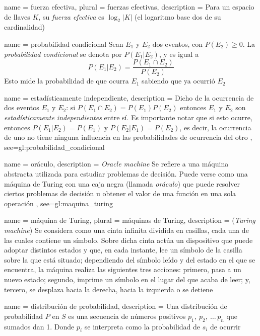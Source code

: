 {
  name = fuerza efectiva,
  plural = fuerzas efectivas,
  description = {
    Para un espacio de llaves $ K $, su \textit{fuerza efectiva} es
    $ \log_2 | K | $ (el logaritmo base dos de su cardinalidad)%
  }
}

{
  name = probabilidad condicional
}
{%
  Sean $ E_1 $ y $ E_2 $ dos eventos, con $ P(E_2) \ge 0 $. La
  \textit{probabilidad condicional} se denota por $ P(E_1 | E_2) $, y es
  igual a
  $$ P(E_1 | E_2) = \frac{P(E_1 \cap E_2)}{P(E_2)} $$
  Esto mide la probabilidad de que ocurra $ E_1 $ sabiendo que ya ocurrió
  $ E_2 $%
}

{
  name = estadísticamente independiente,
  description = {
    Dicho de la ocurrencia de dos eventos $ E_1 $ y $ E_2 $: si
    $ P(E_1 \cap E_2) = P(E_1) P(E_2) $ entonces $ E_1 $ y $ E_2 $ son
    \textit{estadísticamente independientes} entre sí. Es importante notar
    que si esto ocurre, entonces $ P(E_1 | E_2) = P(E_1) $ y
    $ P(E_2 | E_1) = P(E_2) $, es decir, la ocurrencia de uno no tiene ninguna
    influencia en las probabilidades de ocurrencia del otro%
  },
  see={gl:probabilidad_condicional}
}

{
  name = oráculo,
  description = {
    \textit{Oracle machine} Se refiere a una máquina abstracta utilizada para
    estudiar problemas de decisión. Puede verse como una máquina de Turing con
    una caja negra (llamada \textit{oráculo}) que puede resolver ciertos
    problemas de decisión u obtener el valor de una función en una sola
    operación%
  },
  see={gl:maquina_turing}
}

{
  name = máquina de Turing,
  plural = máquinas de Turing,
  description = {
    (\textit{Turing machine}) Se considera como una cinta infinita dividida
    en casillas, cada una de las cuales contiene un símbolo. Sobre dicha cinta
    actúa un dispositivo que puede adoptar distintos estados y que, en cada
    instante, lee un símbolo de la casilla sobre la que está situado;
    dependiendo del símbolo leído y del estado en el que se encuentra, la
    máquina realiza las siguientes tres acciones: primero, pasa a un nuevo
    estado; segundo, imprime un símbolo en el lugar del que acaba de leer;
    y, tercero, se desplaza hacia la derecha, hacia la izquierda o se detiene%
  }
}

{
  name = distribución de probabilidad,
  description = {
    Una distribución de probabilidad $P$ en $S$ es una secuencia de números
    positivos $p_1,\: p_2,\: \dots\, p_n$ que sumados dan 1. Donde $p_i$ se
    interpreta como la probabilidad de $s_i$ de ocurrir%
  }
}

